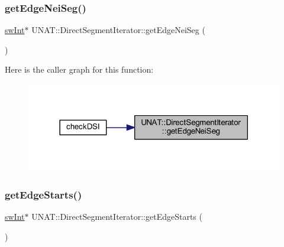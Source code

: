 \mbox{\label{classUNAT_1_1DirectSegmentIterator_a6f801e4fff4b069d6b1fcc3e70073639}} 
\subsubsection{\texorpdfstring{getEdgeNeiSeg()}{getEdgeNeiSeg()}\hspace{0.1cm}{\footnotesize\ttfamily [2/2]}}
{\footnotesize\ttfamily \mbox{\hyperlink{include_2swMacro_8h_a113cf5f6b5377cdf3fac6aa4e443e9aa}{sw\+Int}}$\ast$ U\+N\+A\+T\+::\+Direct\+Segment\+Iterator\+::get\+Edge\+Nei\+Seg (\begin{DoxyParamCaption}{ }\end{DoxyParamCaption})\hspace{0.3cm}{\ttfamily [inline]}}

Here is the caller graph for this function\+:
\nopagebreak
\begin{figure}[H]
\begin{center}
\leavevmode
\includegraphics[width=318pt]{classUNAT_1_1DirectSegmentIterator_a6f801e4fff4b069d6b1fcc3e70073639_icgraph}
\end{center}
\end{figure}
\mbox{\label{classUNAT_1_1DirectSegmentIterator_afd25b37163568da6c2982bd766d346af}} 
\subsubsection{\texorpdfstring{getEdgeStarts()}{getEdgeStarts()}\hspace{0.1cm}{\footnotesize\ttfamily [1/2]}}
{\footnotesize\ttfamily \mbox{\hyperlink{include_2swMacro_8h_a113cf5f6b5377cdf3fac6aa4e443e9aa}{sw\+Int}}$\ast$ U\+N\+A\+T\+::\+Direct\+Segment\+Iterator\+::get\+Edge\+Starts (\begin{DoxyParamCaption}{ }\end{DoxyParamCaption})\hspace{0.3cm}{\ttfamily [inline]}}

